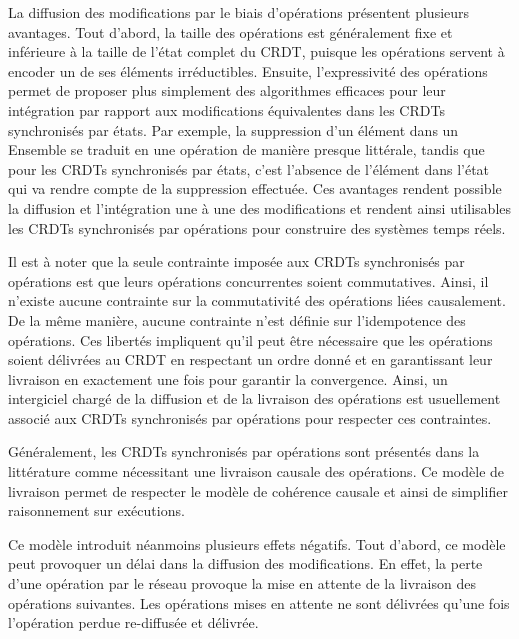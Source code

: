 \documentclass[12pt]{thesul}
\begin{document}
La diffusion des modifications par le biais d'opérations présentent plusieurs avantages.
Tout d'abord, la taille des opérations est généralement fixe et inférieure à la taille de l'état complet du \ac{CRDT}, puisque les opérations servent à encoder un de ses éléments irréductibles.
Ensuite, l'expressivité des opérations permet de proposer plus simplement des algorithmes efficaces pour leur intégration par rapport aux modifications équivalentes dans les \acp{CRDT} synchronisés par états.
Par exemple, la suppression d'un élément dans un Ensemble se traduit en une opération de manière presque littérale, tandis que pour les \acp{CRDT} synchronisés par états, c'est l'absence de l'élément dans l'état qui va rendre compte de la suppression effectuée.
Ces avantages rendent possible la diffusion et l'intégration une à une des modifications et rendent ainsi utilisables les \acp{CRDT} synchronisés par opérations pour construire des systèmes temps réels.

Il est à noter que la seule contrainte imposée aux \acp{CRDT} synchronisés par opérations est que leurs opérations concurrentes soient commutatives.
Ainsi, il n'existe aucune contrainte sur la commutativité des opérations liées causalement.
De la même manière, aucune contrainte n'est définie sur l'idempotence des opérations.
Ces libertés impliquent qu'il peut être nécessaire que les opérations soient délivrées au \ac{CRDT} en respectant un ordre donné et en garantissant leur livraison en exactement une fois pour garantir la convergence.
Ainsi, un intergiciel chargé de la diffusion et de la livraison des opérations est usuellement associé aux \acp{CRDT} synchronisés par opérations pour respecter ces contraintes.

Généralement, les \acp{CRDT} synchronisés par opérations sont présentés dans la littérature comme nécessitant une livraison causale des opérations.
Ce modèle de livraison permet de respecter le modèle de cohérence causale et ainsi de simplifier raisonnement sur exécutions.

Ce modèle introduit néanmoins plusieurs effets négatifs.
Tout d'abord, ce modèle peut provoquer un délai dans la diffusion des modifications.
En effet, la perte d'une opération par le réseau provoque la mise en attente de la livraison des opérations suivantes.
Les opérations mises en attente ne sont délivrées qu'une fois l'opération perdue re-diffusée et délivrée.
\end{document}
